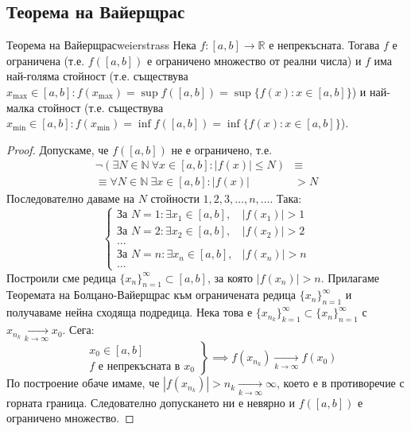 \subsection{Теорема на Вайерщрас}

\begin{theorem}{Теорема на Вайерщрас}{weierstrass}
Нека $f : [a, b] \to \mathbb{R}$ е непрекъсната. Тогава $f$ е ограничена (т.е. $f([a, b])$ е ограничено множество от реални числа) и $f$ има най-голяма стойност (т.е. съществува $x_{\max} \in [a, b] : f(x_{\max}) = \sup f([a, b]) = \sup \{f(x) : x \in [a, b]\}$) и най-малка стойност (т.е. съществува $x_{\min} \in [a, b] : f(x_{\min}) = \inf f([a, b]) = \inf \{f(x) : x \in [a, b]\}$).
\end{theorem}

\begin{proof}
Допускаме, че $f([a, b])$ не е ограничено, т.е.
\begin{align*}
\neg (\exists N \in \mathbb{N}\ \forall x \in [a, b] : |f(x)| \le N) &\equiv \\
\equiv \forall N \in \mathbb{N}\ \exists x \in [a, b] : |f(x)| &> N
\end{align*}
Последователно даваме на $N$ стойности $1, 2, 3, \dots, n, \dots$. Така:
\[
\begin{cases}
\text{За } N = 1 : \exists x_1 \in [a, b], & |f(x_1)| > 1 \\
\text{За } N = 2 : \exists x_2 \in [a, b], & |f(x_2)| > 2 \\
\dots \\
\text{За } N = n : \exists x_n \in [a, b], & |f(x_n)| > n \\
\dots
\end{cases}
\]
Построили сме редица $\{x_n\}_{n=1}^\infty \subset [a, b]$, за която $|f(x_n)| > n$. Прилагаме Теоремата на Болцано-Вайерщрас към ограничената редица $\{x_n\}_{n=1}^\infty$ и получаваме нейна сходяща подредица. Нека това е $\{x_{n_k}\}_{k=1}^\infty \subset \{x_n\}_{n=1}^\infty$ с $x_{n_k} \xrightarrow[k \to \infty]{} x_0$. Сега:
\[
\left.
\begin{aligned}
&x_0 \in [a, b] \\
&f \text{ е непрекъсната в } x_0
\end{aligned}
\right\}
\implies f(x_{n_k}) \xrightarrow[k \to \infty]{} f(x_0)
\]
По построение обаче имаме, че $|f(x_{n_k})| > n_k \xrightarrow[k \to \infty]{} \infty$, което е в противоречие с горната граница. Следователно допускането ни е невярно и $f([a, b])$ е ограничено множество.


\end{proof}
